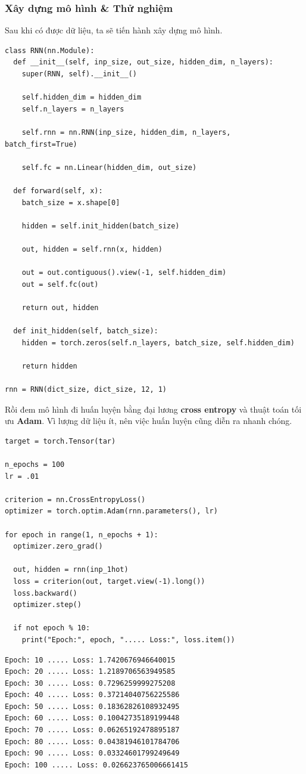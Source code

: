 \documentclass[a4paper]{article}
\begin{document}
\subsubsection{Xây dựng mô hình \& Thử nghiệm}
Sau khi có được dữ liệu, ta sẽ tiến hành xây dựng mô hình.
\begin{lstlisting}
class RNN(nn.Module):
  def __init__(self, inp_size, out_size, hidden_dim, n_layers):
    super(RNN, self).__init__()

    self.hidden_dim = hidden_dim
    self.n_layers = n_layers

    self.rnn = nn.RNN(inp_size, hidden_dim, n_layers, batch_first=True)

    self.fc = nn.Linear(hidden_dim, out_size)

  def forward(self, x):
    batch_size = x.shape[0]

    hidden = self.init_hidden(batch_size)

    out, hidden = self.rnn(x, hidden)

    out = out.contiguous().view(-1, self.hidden_dim)
    out = self.fc(out)

    return out, hidden

  def init_hidden(self, batch_size):
    hidden = torch.zeros(self.n_layers, batch_size, self.hidden_dim)

    return hidden
    
rnn = RNN(dict_size, dict_size, 12, 1)
\end{lstlisting}
Rồi đem mô hình đi huấn luyện bằng đại lương \textbf{cross entropy} và thuật toán tối ưu \textbf{Adam}. Vì lượng dữ liệu ít, nên việc huấn luyện cũng diễn ra nhanh chóng.
\begin{lstlisting}
target = torch.Tensor(tar)

n_epochs = 100
lr = .01

criterion = nn.CrossEntropyLoss()
optimizer = torch.optim.Adam(rnn.parameters(), lr)

for epoch in range(1, n_epochs + 1):
  optimizer.zero_grad()

  out, hidden = rnn(inp_1hot)
  loss = criterion(out, target.view(-1).long())
  loss.backward()
  optimizer.step()

  if not epoch % 10:
    print("Epoch:", epoch, "..... Loss:", loss.item())
\end{lstlisting}
\begin{verbatim}
Epoch: 10 ..... Loss: 1.7420676946640015
Epoch: 20 ..... Loss: 1.2189706563949585
Epoch: 30 ..... Loss: 0.7296259999275208
Epoch: 40 ..... Loss: 0.37214040756225586
Epoch: 50 ..... Loss: 0.18362826108932495
Epoch: 60 ..... Loss: 0.10042735189199448
Epoch: 70 ..... Loss: 0.06265192478895187
Epoch: 80 ..... Loss: 0.04381946101784706
Epoch: 90 ..... Loss: 0.03324601799249649
Epoch: 100 ..... Loss: 0.026623765006661415
\end{verbatim}
\end{document}
